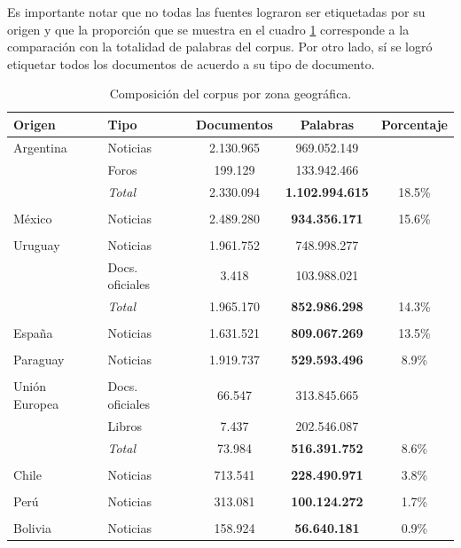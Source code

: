 Es importante notar que no todas las fuentes lograron ser etiquetadas por su origen y que la
proporción que se muestra en el cuadro \ref{table:corpus_country} corresponde a la comparación
con la totalidad de palabras del corpus. Por otro lado, sí se logró etiquetar todos los documentos
de acuerdo a su tipo de documento.

\begin{table}[h]
    \centering
    \begin{tabular}{llccc}
        \hline
        Origen & Tipo & Documentos & Palabras & Porcentaje\\
        \hline
        Argentina
         & Noticias & 2.130.965 & 969.052.149\\
         & Foros & 199.129 & 133.942.466\\
         & \textit{Total} & 2.330.094 & \textbf{1.102.994.615} & 18.5\%\\
        \\
        México
         & Noticias & 2.489.280 & \textbf{934.356.171} & 15.6\%\\
        \\
        Uruguay
         & Noticias & 1.961.752 & 748.998.277\\
         & Docs. oficiales & 3.418 & 103.988.021\\
         & \textit{Total} & 1.965.170 & \textbf{852.986.298} & 14.3\%\\
        \\
        España
         & Noticias & 1.631.521 & \textbf{809.067.269} & 13.5\%\\
        \\
        Paraguay
         & Noticias & 1.919.737 & \textbf{529.593.496} & 8.9\%\\
        \\
        Unión Europea
         & Docs. oficiales & 66.547 & 313.845.665\\
         & Libros & 7.437 & 202.546.087\\
         & \textit{Total} & 73.984 & \textbf{516.391.752} & 8.6\%\\
        \\
        Chile
         & Noticias & 713.541 & \textbf{228.490.971} & 3.8\%\\
        \\
        Perú
         & Noticias & 313.081 & \textbf{100.124.272} & 1.7\%\\
        \\
        Bolivia
         & Noticias & 158.924 & \textbf{56.640.181} & 0.9\%\\
        \hline
    \end{tabular}
    \caption{Composición del corpus por zona geográfica.}
    \label{table:corpus_country}
\end{table}

